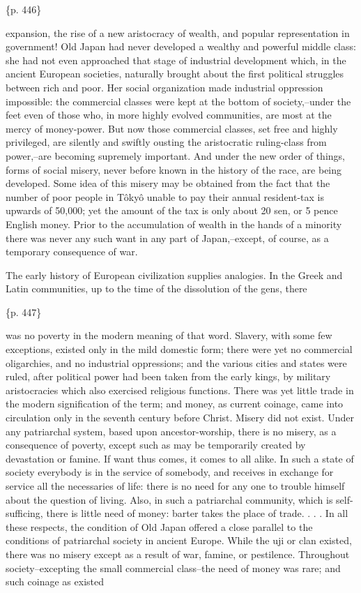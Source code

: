 \{p. 446\}

expansion, the rise of a new aristocracy of wealth, and popular representation in government! Old Japan had never developed a wealthy and powerful middle class: she had not even approached that stage of industrial development which, in the ancient European societies, naturally brought about the first political struggles between rich and poor. Her social organization made industrial oppression impossible: the commercial classes were kept at the bottom of society,--under the feet even of those who, in more highly evolved communities, are most at the mercy of money-power. But now those commercial classes, set free and highly privileged, are silently and swiftly ousting the aristocratic ruling-class from power,--are becoming supremely important. And under the new order of things, forms of social misery, never before known in the history of the race, are being developed. Some idea of this misery may be obtained from the fact that the number of poor people in Tôkyô unable to pay their annual resident-tax is upwards of 50,000; yet the amount of the tax is only about 20 sen, or 5 pence English money. Prior to the accumulation of wealth in the hands of a minority there was never any such want in any part of Japan,--except, of course, as a temporary consequence of war.

The early history of European civilization supplies analogies. In the Greek and Latin communities, up to the time of the dissolution of the gens, there

\{p. 447\}

was no poverty in the modern meaning of that word. Slavery, with some few exceptions, existed only in the mild domestic form; there were yet no commercial oligarchies, and no industrial oppressions; and the various cities and states were ruled, after political power had been taken from the early kings, by military aristocracies which also exercised religious functions. There was yet little trade in the modern signification of the term; and money, as current coinage, came into circulation only in the seventh century before Christ. Misery did not exist. Under any patriarchal system, based upon ancestor-worship, there is no misery, as a consequence of poverty, except such as may be temporarily created by devastation or famine. If want thus comes, it comes to all alike. In such a state of society everybody is in the service of somebody, and receives in exchange for service all the necessaries of life: there is no need for any one to trouble himself about the question of living. Also, in such a patriarchal community, which is self-sufficing, there is little need of money: barter takes the place of trade. . . . In all these respects, the condition of Old Japan offered a close parallel to the conditions of patriarchal society in ancient Europe. While the uji or clan existed, there was no misery except as a result of war, famine, or pestilence. Throughout society--excepting the small commercial class--the need of money was rare; and such coinage as existed


